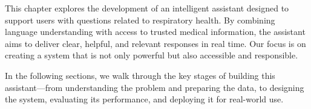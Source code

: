 This chapter explores the development of an intelligent assistant designed to support users with questions related to respiratory health. By combining language understanding with access to trusted medical information, the assistant aims to deliver clear, helpful, and relevant responses in real time. Our focus is on creating a system that is not only powerful but also accessible and responsible.

In the following sections, we walk through the key stages of building this assistant—from understanding the problem and preparing the data, to designing the system, evaluating its performance, and deploying it for real-world use.